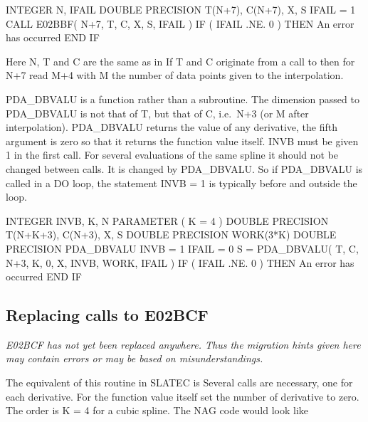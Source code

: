 \documentclass[11pt,twoside,nolof]{starlink}
\begin{document}
\begin{terminalv}
      INTEGER N, IFAIL
      DOUBLE PRECISION T(N+7), C(N+7), X, S
      IFAIL = 1
      CALL E02BBF( N+7, T, C, X, S, IFAIL )
      IF ( IFAIL .NE. 0 ) THEN
         An error has occurred
      END IF
\end{terminalv}

   Here N, T and C are the same as in
   If T and C originate from
   a call to
   then for N+7 read M+4 with M the number of data
   points given to the interpolation.

   PDA\_DBVALU is a function rather than a subroutine. The dimension passed
   to PDA\_DBVALU is not that of T, but that of C, i.e.\ N+3 (or M after
   interpolation). PDA\_DBVALU returns the value of any derivative, the fifth
   argument is zero so that it returns the function value itself. INVB
   must be given 1 in the first call. For several evaluations of the
   same spline it should not be changed between calls. It is changed by
   PDA\_DBVALU. So if PDA\_DBVALU is called in a DO loop, the statement INVB = 1
   is typically before and outside the loop.

\begin{terminalv}
      INTEGER INVB, K, N
      PARAMETER ( K = 4 )
      DOUBLE PRECISION T(N+K+3), C(N+3), X, S
      DOUBLE PRECISION WORK(3*K)
      DOUBLE PRECISION PDA_DBVALU
      INVB = 1
      IFAIL = 0
      S = PDA_DBVALU( T, C, N+3, K, 0, X, INVB, WORK, IFAIL )
      IF ( IFAIL .NE. 0 ) THEN
         An error has occurred
      END IF
\end{terminalv}


\subsection{Replacing calls to E02BCF}

\emph{E02BCF has not yet been replaced anywhere. Thus the
   migration hints given here may contain errors or may be based on
   misunderstandings.\/}

   The equivalent of this routine in SLATEC is
   Several calls are
   necessary, one for each derivative. For the function value itself set
   the number of derivative to zero. The order is K = 4 for a cubic
   spline. The NAG code would look like
\end{document}
